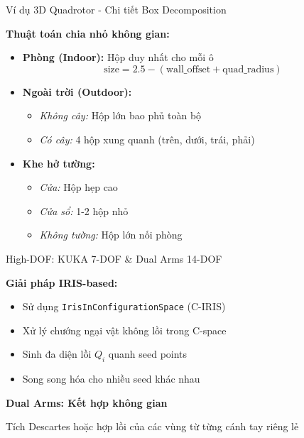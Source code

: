 \documentclass[aspectratio=169]{beamer}
\begin{document}
\begin{frame}{Ví dụ 3D Quadrotor - Chi tiết Box Decomposition}

    \textbf{Thuật toán chia nhỏ không gian:}
    \begin{itemize}
        \item \textbf{Phòng (Indoor):} Hộp duy nhất cho mỗi ô
              \[
                  \text{size} = 2.5 - (\text{wall\_offset} + \text{quad\_radius})
              \]

        \item \textbf{Ngoài trời (Outdoor):}
              \begin{itemize}
                  \item \textit{Không cây:} Hộp lớn bao phủ toàn bộ
                  \item \textit{Có cây:} 4 hộp xung quanh (trên, dưới, trái, phải)
              \end{itemize}

        \item \textbf{Khe hở tường:}
              \begin{itemize}
                  \item \textit{Cửa:} Hộp hẹp cao
                  \item \textit{Cửa sổ:} 1-2 hộp nhỏ  
                  \item \textit{Không tường:} Hộp lớn nối phòng
              \end{itemize}
    \end{itemize}

\end{frame}

\begin{frame}{High-DOF: KUKA 7-DOF \& Dual Arms 14-DOF}

    \textbf{Giải pháp IRIS-based:}
    \begin{itemize}
        \item Sử dụng \texttt{IrisInConfigurationSpace} (C-IRIS)
        \item Xử lý chướng ngại vật không lồi trong C-space
        \item Sinh đa diện lồi $Q_i$ quanh seed points
        \item Song song hóa cho nhiều seed khác nhau
    \end{itemize}

    \vspace{1em}
    \textbf{Dual Arms: Kết hợp không gian}
    
    Tích Descartes hoặc hợp lồi của các vùng từ từng cánh tay riêng lẻ

\end{frame}
\end{document}
